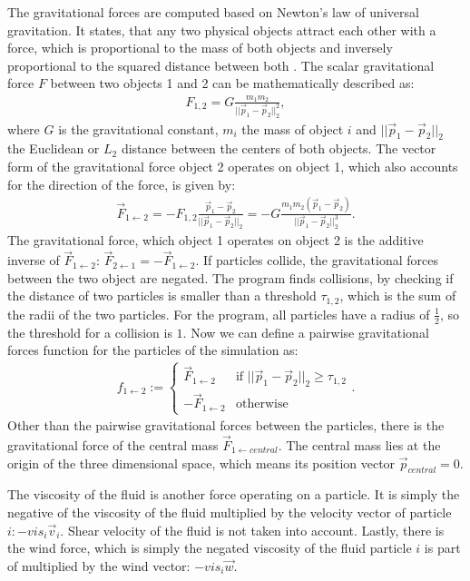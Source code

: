 \documentclass[twoside,11pt]{article}
\begin{document}
The gravitational forces are computed based on Newton's law of
universal gravitation.
It states, that any two physical objects attract each other
with a force, which is proportional to the mass of both objects and
inversely proportional to the squared distance between both
\citep{feynman1963}.
The scalar gravitational force $F$ between two objects 1 and 2 can be
mathematically described as:
\begin{align}
  F_{1,2} = G\frac{m_1 m_2}{||\vec{p}_1 - \vec{p}_2||_2^2},
\end{align}
where $G$ is the gravitational constant, $m_i$ the mass of object $i$
and $||\vec{p}_1 - \vec{p}_2||_2$ the Euclidean or $L_2$ distance
between the centers of both objects.
The vector form of the gravitational force object 2 operates on object
1, which also accounts for the direction of the force, is given by:
\begin{align}
  \vec{F}_{1\leftarrow2} = -F_{1,2}\frac{\vec{p}_1 - \vec{p}_2}
                   {||\vec{p}_1 - \vec{p}_2||_2}
          = -G\frac{m_1 m_2 (\vec{p}_1 - \vec{p}_2)}
                   {||\vec{p}_1 - \vec{p}_2||_2^3}.
\end{align}
The gravitational force, which object 1 operates on object 2 is the
additive inverse of $\vec{F}_{1 \leftarrow 2}$:
$\vec{F}_{2 \leftarrow 1} = -\vec{F}_{1 \leftarrow 2}$.
If particles collide, the gravitational forces between the two object
are negated.
The program finds collisions, by checking if the distance of two
particles is smaller than a threshold $\tau_{1,2}$, which is the sum
of the radii of the two particles.
For the program, all particles have a radius of $\frac{1}{2}$, so the
threshold for a collision is $1$.
Now we can define a pairwise gravitational forces function for the
particles of the simulation as:
\begin{align}
  f_{1 \leftarrow 2} := \begin{cases}
    \vec{F}_{1 \leftarrow 2} &\text{if }
      ||\vec{p}_1 - \vec{p}_2||_2 \ge \tau_{1,2} \\
    -\vec{F}_{1 \leftarrow 2} &\text{otherwise}
  \end{cases}.
\end{align}
Other than the pairwise gravitational forces between the particles,
there is the gravitational force of the central mass
$\vec{F}_{1 \leftarrow central}$.
The central mass lies at the origin of the three dimensional space,
which means its position vector $\vec{p}_{central} = 0$.

The viscosity of the fluid is another force operating on a particle.
It is simply the negative of the viscosity of the fluid multiplied
by the velocity vector of particle $i: -vis_i \vec{v}_i$.
Shear velocity of the fluid is not taken into account.
Lastly, there is the wind force, which is simply the negated viscosity
of the fluid particle $i$ is part of multiplied by the wind vector:
$-vis_i \vec{w}$.
\end{document}
